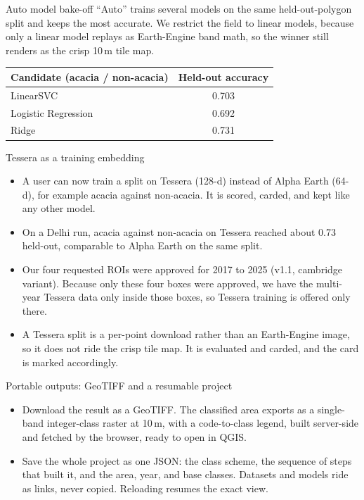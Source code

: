 \documentclass[aspectratio=169]{beamer}
\begin{document}
\begin{frame}{Auto model bake-off}
``Auto'' trains several models on the same held-out-polygon split and keeps the most accurate. We
restrict the field to linear models, because only a linear model replays as Earth-Engine band math, so
the winner still renders as the crisp 10\,m tile map.
\vspace{4mm}
\centering
\begin{tabular}{lc}
\toprule
Candidate (acacia / non-acacia) & Held-out accuracy \\
\midrule
LinearSVC & 0.703 \\
Logistic Regression & 0.692 \\
Ridge & 0.731 \\
\bottomrule
\end{tabular}
\end{frame}

\begin{frame}{Tessera as a training embedding}
\begin{itemize}\small
  \item A user can now train a split on Tessera (128-d) instead of Alpha Earth (64-d), for example
  acacia against non-acacia. It is scored, carded, and kept like any other model.
  \item On a Delhi run, acacia against non-acacia on Tessera reached about 0.73 held-out, comparable to
  Alpha Earth on the same split.
  \item Our four requested ROIs were approved for 2017 to 2025 (v1.1, cambridge variant). Because only
  these four boxes were approved, we have the multi-year Tessera data only inside those boxes, so
  Tessera training is offered only there.
  \item A Tessera split is a per-point download rather than an Earth-Engine image, so it does not ride
  the crisp tile map. It is evaluated and carded, and the card is marked accordingly.
\end{itemize}
\end{frame}

\begin{frame}{Portable outputs: GeoTIFF and a resumable project}
\begin{itemize}
  \item Download the result as a GeoTIFF. The classified area exports as a single-band integer-class
  raster at 10\,m, with a code-to-class legend, built server-side and fetched by the browser, ready to
  open in QGIS.
  \item Save the whole project as one JSON: the class scheme, the sequence of steps that built it, and
  the area, year, and base classes. Datasets and models ride as links, never copied. Reloading resumes
  the exact view.
\end{itemize}
\end{frame}
\end{document}
